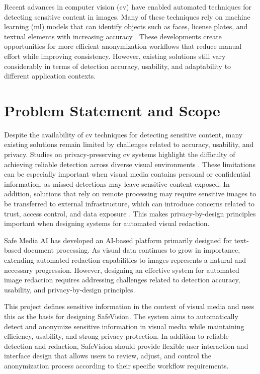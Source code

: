 Recent advances in computer vision (\acrshort{cv}) have enabled automated techniques for detecting sensitive content in images. Many of these techniques rely on machine learning (\acrshort{ml}) models that can identify objects such as faces, license plates, and textual elements with increasing accuracy \cite{raina2023egoblur}. These developments create opportunities for more efficient \gls{anonymization} workflows that reduce manual effort while improving consistency. However, existing solutions still vary considerably in terms of detection accuracy, usability, and adaptability to different application contexts.


\section{Problem Statement and Scope}

Despite the availability of \acrshort{cv} techniques for detecting sensitive content, many existing solutions remain limited by challenges related to accuracy, usability, and privacy. Studies on privacy-preserving \acrshort{cv} systems highlight the difficulty of achieving reliable detection across diverse visual environments \cite{piao2024deidentification}. These limitations can be especially important when visual media contains personal or confidential information, as missed detections may leave sensitive content exposed. In addition, solutions that rely on remote processing may require sensitive images to be transferred to external infrastructure, which can introduce concerns related to trust, access control, and data exposure \cite{raina2023egoblur}. This makes \gls{privacy-by-design} principles important when designing systems for automated visual redaction.

Safe Media AI has developed an AI-based platform primarily designed for text-based document processing. As visual data continues to grow in importance, extending automated redaction capabilities to images represents a natural and necessary progression. However, designing an effective system for automated image redaction requires addressing challenges related to detection accuracy, usability, and privacy-by-design principles.

This project defines sensitive information in the context of visual media and uses this as the basis for designing \gls{SafeVision}. The system aims to automatically detect and anonymize sensitive information in visual media while maintaining efficiency, usability, and strong privacy protection. In addition to reliable detection and redaction, \gls{SafeVision} should provide flexible user interaction and interface design that allows users to review, adjust, and control the \gls{anonymization} process according to their specific workflow requirements.

